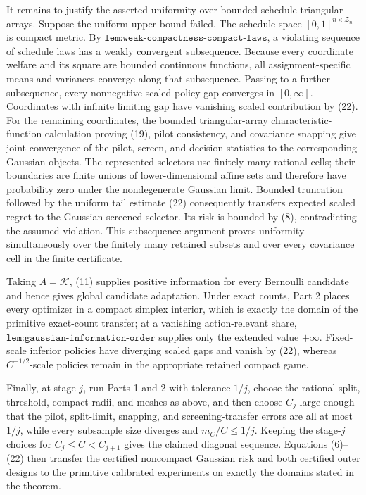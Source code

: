 It remains to justify the asserted uniformity over bounded-schedule triangular arrays.  Suppose the uniform upper bound failed.  The schedule space \([0,1]^{n\times\mathcal Z_n}\) is compact metric.  By \(\texttt{lem:weak-compactness-compact-laws}\), a violating sequence of schedule laws has a weakly convergent subsequence.  Because every coordinate welfare and its square are bounded continuous functions, all assignment-specific means and variances converge along that subsequence.  Passing to a further subsequence, every nonnegative scaled policy gap converges in \([0,\infty]\).  Coordinates with infinite limiting gap have vanishing scaled contribution by (22).  For the remaining coordinates, the bounded triangular-array characteristic-function calculation proving (19), pilot consistency, and covariance snapping give joint convergence of the pilot, screen, and decision statistics to the corresponding Gaussian objects.  The represented selectors use finitely many rational cells; their boundaries are finite unions of lower-dimensional affine sets and therefore have probability zero under the nondegenerate Gaussian limit.  Bounded truncation followed by the uniform tail estimate (22) consequently transfers expected scaled regret to the Gaussian screened selector.  Its risk is bounded by (8), contradicting the assumed violation.  This subsequence argument proves uniformity simultaneously over the finitely many retained subsets and over every covariance cell in the finite certificate.

Taking \(A=\mathcal K\), (11) supplies positive information for every Bernoulli candidate and hence gives global candidate adaptation.  Under exact counts, Part 2 places every optimizer in a compact simplex interior, which is exactly the domain of the primitive exact-count transfer; at a vanishing action-relevant share, \(\texttt{lem:gaussian-information-order}\) supplies only the extended value \(+\infty\).  Fixed-scale inferior policies have diverging scaled gaps and vanish by (22), whereas \(C^{-1/2}\)-scale policies remain in the appropriate retained compact game.

Finally, at stage \(j\), run Parts 1 and 2 with tolerance \(1/j\), choose the rational split, threshold, compact radii, and meshes as above, and then choose \(C_j\) large enough that the pilot, split-limit, snapping, and screening-transfer errors are all at most \(1/j\), while every subsample size diverges and \(m_C/C\leq1/j\).  Keeping the stage-\(j\) choices for \(C_j\leq C<C_{j+1}\) gives the claimed diagonal sequence.  Equations (6)--(22) then transfer the certified noncompact Gaussian risk and both certified outer designs to the primitive calibrated experiments on exactly the domains stated in the theorem.
